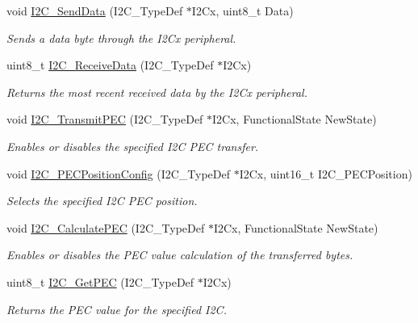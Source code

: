 \begin{DoxyCompactItemize}
void \hyperlink{group___i2_c_ga7bd9e70b8eafde0dd5eb42b0d95fe1a9}{I2\-C\-\_\-\-Send\-Data} (I2\-C\-\_\-\-Type\-Def $\ast$I2\-Cx, uint8\-\_\-t Data)
\begin{DoxyCompactList}\small\item\em Sends a data byte through the I2\-Cx peripheral. \end{DoxyCompactList}\item 
uint8\-\_\-t \hyperlink{group___i2_c_gaeaaa4b6f77f50eb57465148c55d27fb2}{I2\-C\-\_\-\-Receive\-Data} (I2\-C\-\_\-\-Type\-Def $\ast$I2\-Cx)
\begin{DoxyCompactList}\small\item\em Returns the most recent received data by the I2\-Cx peripheral. \end{DoxyCompactList}\item 
void \hyperlink{group___i2_c_gaa27d1440290fe601e730b6980999afe3}{I2\-C\-\_\-\-Transmit\-P\-E\-C} (I2\-C\-\_\-\-Type\-Def $\ast$I2\-Cx, Functional\-State New\-State)
\begin{DoxyCompactList}\small\item\em Enables or disables the specified I2\-C P\-E\-C transfer. \end{DoxyCompactList}\item 
void \hyperlink{group___i2_c_ga5d0f939bdd45542502827bf408f24161}{I2\-C\-\_\-\-P\-E\-C\-Position\-Config} (I2\-C\-\_\-\-Type\-Def $\ast$I2\-Cx, uint16\-\_\-t I2\-C\-\_\-\-P\-E\-C\-Position)
\begin{DoxyCompactList}\small\item\em Selects the specified I2\-C P\-E\-C position. \end{DoxyCompactList}\item 
void \hyperlink{group___i2_c_gae86801251359226c35745e0a258388b0}{I2\-C\-\_\-\-Calculate\-P\-E\-C} (I2\-C\-\_\-\-Type\-Def $\ast$I2\-Cx, Functional\-State New\-State)
\begin{DoxyCompactList}\small\item\em Enables or disables the P\-E\-C value calculation of the transferred bytes. \end{DoxyCompactList}\item 
uint8\-\_\-t \hyperlink{group___i2_c_ga7bf75e7c27c0e1d73e70fc0e1c7cd1dd}{I2\-C\-\_\-\-Get\-P\-E\-C} (I2\-C\-\_\-\-Type\-Def $\ast$I2\-Cx)
\begin{DoxyCompactList}\small\item\em Returns the P\-E\-C value for the specified I2\-C. \end{DoxyCompactList}\item 

\end{DoxyCompactItemize}

